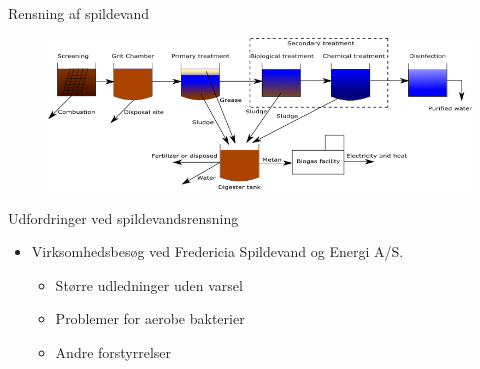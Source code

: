 

\begin{frame}{Rensning af spildevand}{}
\vfill\vfill\centering
\begin{figure}[H]
\centering
\includegraphics[width=1\textwidth]{Sections/pictures/wwtp.png}
\end{figure}
\vfill\vfill
\end{frame}
%


\begin{frame}{Udfordringer ved spildevandsrensning}{}
\vfill\vfill\centering
\begin{itemize}
	\item<1-> Virksomhedsbesøg ved Fredericia Spildevand og Energi A/S.
	
	\begin{itemize}
		\item<2-> Større udledninger uden varsel
		\vspace{2mm}
		\item<3-> Problemer for aerobe bakterier
		\vspace{2mm}
		\item<4-> Andre forstyrrelser
	\end{itemize}	

\end{itemize}
\vfill\vfill
\end{frame}

